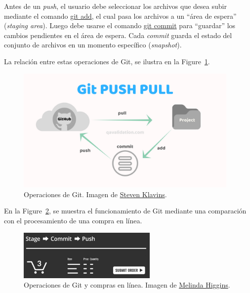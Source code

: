 \documentclass[
  letterpaper,
  DIV=11,
  numbers=noendperiod]{scrreprt}
\begin{document}
Antes de un \emph{push}, el usuario debe seleccionar los archivos que
desea subir mediante el comando
\href{https://git-scm.com/docs/git-add}{git add}, el cual pasa los
archivos a un ``área de espera'' (\emph{staging area}). Luego debe
usarse el comando \href{https://git-scm.com/docs/git-commit}{git commit}
para ``guardar'' los cambios pendientes en el área de espera. Cada
\emph{commit} guarda el estado del conjunto de archivos en un momento
específico (\emph{snapshot}).

La relación entre estas operaciones de Git, se ilustra en la
Figure~\ref{fig-git-push-pull-commit}.

\begin{figure}

{\centering \includegraphics[width=4.27in,height=\textheight]{./img/git-push-pull-commit.png}

}

\caption{\label{fig-git-push-pull-commit}Operaciones de Git. Imagen de
\href{https://medium.com/@stevenklavins94/version-control-part-4-c9387cf5b33e}{Steven
Klavins}.}

\end{figure}

En la Figure~\ref{fig-git-stage-commit-push}, se muestra el
funcionamiento de Git mediante una comparación con el procesamiento de
una compra en línea.

\begin{figure}

{\centering \includegraphics[width=2.66in,height=\textheight]{./img/git-stage-commit-push.png}

}

\caption{\label{fig-git-stage-commit-push}Operaciones de Git y compras
en línea. Imagen de
\href{https://www.coursera.org/learn/reproducible-templates-analysis/lecture/NGbQv/git-and-github-part-2}{Melinda
Higgins}.}

\end{figure}
\end{document}
